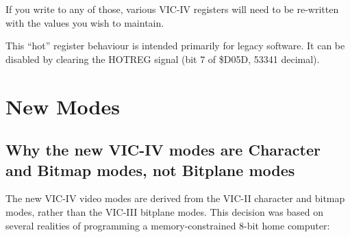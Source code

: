 If you write to any of those, various VIC-IV registers will need to be re-written
with the values you wish to maintain.

This ``hot'' register behaviour is intended primarily for legacy software.
It can be disabled by clearing the HOTREG signal (bit 7 of \$D05D, 53341 decimal).

\section{New Modes}

\subsection{Why the new VIC-IV modes are Character and Bitmap modes, not Bitplane modes}

The new VIC-IV video modes are derived from the VIC-II character and bitmap modes, rather than the VIC-III
bitplane modes. This decision was based on several realities of programming a memory-constrained 8-bit home computer:

